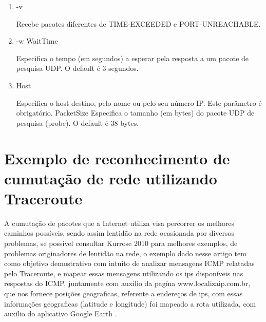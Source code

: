 \documentclass[
	article,			%
	11pt,				%
	oneside,			%
	a4paper,			%
	english,			%
	brazil,				%
	sumario=tradicional
	]{abntex2}
\begin{document}
\begin{enumerate}
	\item -v
	
	Recebe pacotes diferentes de TIME-EXCEEDED e PORT-UNREACHABLE.
	
	\item -w WaitTime 
	
	Especifica o tempo (em segundos) a esperar pela resposta a um pacote de pesquisa UDP. O default é 3 segundos.
	
	
	\item Host      
	
	Especifica o host destino, pelo nome ou pelo seu número IP. Este parâmetro é obrigatório. PacketSize Especifica o tamanho (em bytes)  do pacote UDP de pesquisa (probe). O default é 38 bytes.     
\end{enumerate}                    


\section{Exemplo de reconhecimento de cumutação de rede utilizando Traceroute}
A cumutação de pacotes que a Internet utiliza visa percorrer os melhores caminhos possíveis, sendo assim lentidão na rede ocasionada por diversos problemas, se possivel consultar Kurrose 2010 para melhores exemplos, de problemas originadores de lentidão na rede, o exemplo dado nesse artigo tem como objetivo demostrativo com intuito de analizar mensagens ICMP relatadas pelo Traceroute, e mapear essas mensagens utilizando os ips disponíveis nas respostas do ICMP, juntamente com auxilio da pagína www.localizaip.com.br, que nos fornece posições geograficas, referente a endereços de ips, com essas informações geograficas (latitude e longitude) foi mapeado a rota utilizada, com auxilio do aplicativo Google Earth . 
\end{document}
